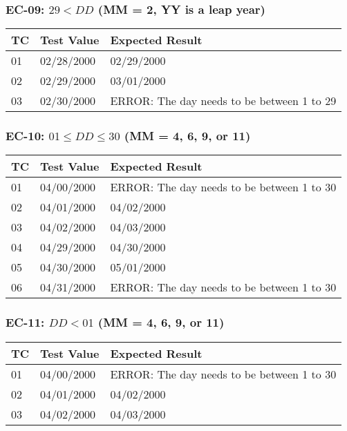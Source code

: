 \documentclass[11pt, oneside]{article}   	%
\begin{document}
\subsubsection{EC-09: $29 < DD$ (MM = 2, YY is a leap year)}
\begin{table}[H]
\begin{tabular}{|l|l|l|}
\hline
TC & Test Value & Expected Result                            \\ \hline
01 & 02/28/2000 & 02/29/2000                                 \\ \hline
02 & 02/29/2000 & 03/01/2000                                 \\ \hline
03 & 02/30/2000 & ERROR: The day needs to be between 1 to 29 \\ \hline
\end{tabular}
\end{table}

\subsubsection{EC-10: $01 \leq DD \leq 30$ (MM = 4, 6, 9, or 11)}
\begin{table}[H]
\begin{tabular}{|l|l|l|}
\hline
TC & Test Value & Expected Result                            \\ \hline
01 & 04/00/2000 & ERROR: The day needs to be between 1 to 30 \\ \hline
02 & 04/01/2000 & 04/02/2000                                 \\ \hline
03 & 04/02/2000 & 04/03/2000                                 \\ \hline
04 & 04/29/2000 & 04/30/2000                                 \\ \hline
05 & 04/30/2000 & 05/01/2000                                 \\ \hline
06 & 04/31/2000 & ERROR: The day needs to be between 1 to 30 \\ \hline
\end{tabular}
\end{table}

\subsubsection{EC-11: $DD < 01$ (MM = 4, 6, 9, or 11)}
\begin{table}[H]
\begin{tabular}{|l|l|l|}
\hline
TC & Test Value & Expected Result                            \\ \hline
01 & 04/00/2000 & ERROR: The day needs to be between 1 to 30 \\ \hline
02 & 04/01/2000 & 04/02/2000                                 \\ \hline
03 & 04/02/2000 & 04/03/2000                                 \\ \hline
\end{tabular}
\end{table}
\end{document}
